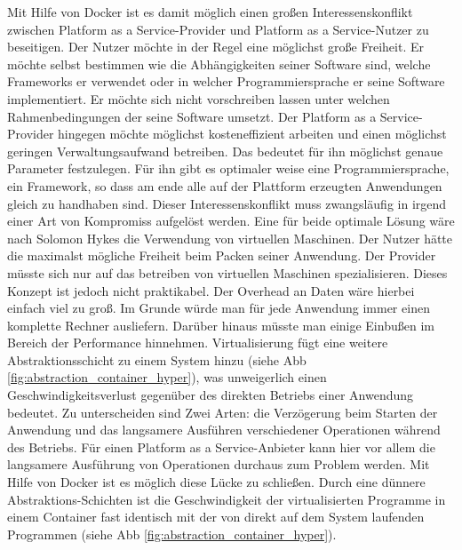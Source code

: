 Mit Hilfe von Docker ist es damit möglich einen großen Interessenskonflikt zwischen Platform as a Service-Provider und Platform as a Service-Nutzer zu beseitigen.
Der Nutzer möchte in der Regel eine möglichst große Freiheit. Er möchte selbst bestimmen wie die Abhängigkeiten seiner Software sind, welche Frameworks er verwendet oder in welcher Programmiersprache er seine Software implementiert. Er möchte sich nicht vorschreiben lassen unter welchen Rahmenbedingungen der seine Software umsetzt. Der Platform as a Service-Provider hingegen möchte möglichst kosteneffizient arbeiten und einen möglichst geringen Verwaltungsaufwand betreiben. Das bedeutet für ihn möglichst genaue Parameter festzulegen. Für ihn gibt es optimaler weise eine Programmiersprache, ein Framework, so dass am ende alle auf der Plattform erzeugten Anwendungen gleich zu handhaben sind. Dieser Interessenskonflikt muss zwangsläufig in irgend einer Art von Kompromiss aufgelöst werden.
Eine für beide optimale Lösung wäre nach Solomon Hykes \cite[Zeit 13:50]{hykes_introduction_2013} die Verwendung von virtuellen Maschinen. Der Nutzer hätte die maximalst mögliche Freiheit beim Packen seiner Anwendung. Der Provider müsste sich nur auf das betreiben von virtuellen Maschinen spezialisieren. Dieses Konzept ist jedoch nicht praktikabel. Der Overhead an Daten wäre hierbei einfach viel zu groß. Im Grunde würde man für jede Anwendung immer einen komplette Rechner ausliefern. Darüber hinaus müsste man einige Einbußen im Bereich der Performance hinnehmen.
\glqq Virtualisierung fügt eine weitere Abstraktionsschicht zu einem System hinzu (siehe Abb \ref{fig:abstraction_container_hyper}), was unweigerlich einen Geschwindigkeitsverlust gegenüber des direkten Betriebs einer Anwendung bedeutet. Zu unterscheiden sind Zwei Arten: die Verzögerung beim Starten der Anwendung und das langsamere Ausführen verschiedener Operationen während des Betriebs.\grqq \cite[Seite 4]{schroder_container-virtualisierung_2014}
Für einen Platform as a Service-Anbieter kann hier vor allem die langsamere Ausführung von Operationen durchaus zum Problem werden.
Mit Hilfe von Docker ist es möglich diese Lücke zu schließen. Durch eine dünnere Abstraktions-Schichten ist die Geschwindigkeit der virtualisierten Programme in einem Container fast identisch mit der von direkt auf dem System laufenden Programmen (siehe Abb \ref{fig:abstraction_container_hyper}).\cite{schroder_container-virtualisierung_2014}
